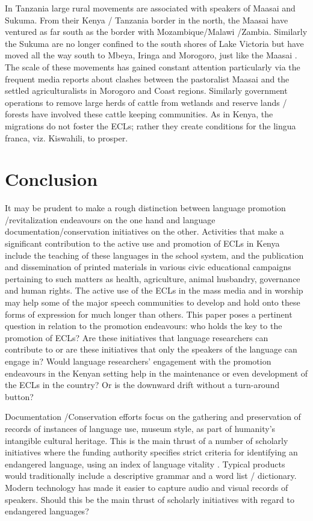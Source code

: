 \documentclass[output=paper,colorlinks,citecolor=brown]{langscibook}
\begin{document}
In Tanzania large rural movements are associated with speakers of Maasai and Sukuma. From their Kenya / Tanzania border in the north, the Maasai have ventured as far south as the border with Mozambique/Malawi /Zambia. Similarly the Sukuma are no longer confined to the south shores of Lake Victoria but have moved all the way south to Mbeya, Iringa and Morogoro, just like the Maasai \citep{MuzaleRugemalira2008}. The scale of these movements has gained constant attention particularly via the frequent media reports about clashes between the pastoralist Maasai and the settled agriculturalists in Morogoro and Coast regions. Similarly government operations to remove large herds of cattle from wetlands and reserve lands / forests have involved these cattle keeping communities. As in Kenya, the migrations do not foster the ECLs; rather they create conditions for the lingua franca, viz. Kiswahili, to prosper.

\section{Conclusion}\label{sec:kioko:7}

It may be prudent to make a rough distinction between language promotion /revitalization endeavours on the one hand and language documentation/conservation initiatives on the other.  Activities that make a significant contribution to the active use and promotion of ECLs in Kenya include the teaching of these languages in the school system, and the publication and dissemination of printed materials in various civic educational campaigns pertaining to such matters as health, agriculture, animal husbandry, governance and human rights. The active use of the ECLs in the mass media and in worship may help some of the major speech communities to develop and hold onto these forms of expression for much longer than others.  This paper poses a pertinent question in relation to the promotion endeavours:  who holds the key to the promotion of ECLs? Are these initiatives that language researchers can contribute to or are these initiatives that only the speakers of the language can engage in? Would language researchers’ engagement with the promotion endeavours in the Kenyan setting help in the maintenance or even development of the ECLs in the country? Or is the downward drift without a turn-around button?

Documentation /Conservation efforts focus on the gathering and preservation of records of instances of language use, museum style, as part of humanity’s intangible cultural heritage. This is the main thrust of a number of scholarly initiatives where the funding authority specifies strict criteria for identifying an endangered language, using an index of language vitality \citep{UNESCO2003}. Typical products would traditionally include a descriptive grammar and a word list / dictionary. Modern technology has made it easier to capture audio and visual records of speakers. Should this be the main thrust of scholarly initiatives with regard to endangered languages?
\end{document}
